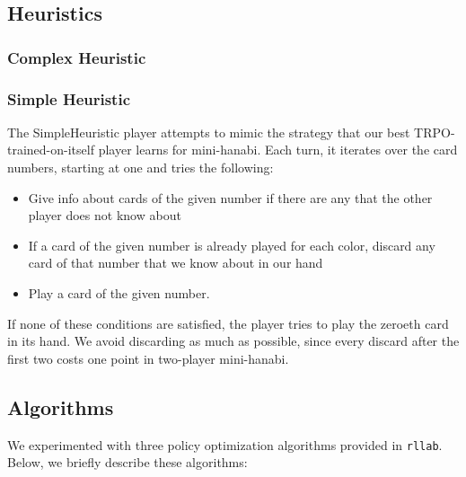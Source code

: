 \subsection{Heuristics}

\subsubsection{Complex Heuristic}

\subsubsection{Simple Heuristic}


The SimpleHeuristic player attempts to mimic the strategy that our best
TRPO-trained-on-itself player learns for mini-hanabi.
Each turn, it iterates over the card numbers, starting at one and tries the following:

\begin{itemize}[leftmargin=*]
\item Give info about cards of the given number if there are any that the other player does not know about
\item If a card of the given number is already played for each color, discard any card of that number that we know about in our hand
\item Play a card of the given number.
\end{itemize}

If none of these conditions are satisfied, the player tries to play the zeroeth card in
its hand. We avoid discarding as much as possible, since every discard after
the first two costs one point in two-player mini-hanabi.

\subsection{Algorithms}
We experimented with three policy optimization algorithms provided in
\texttt{rllab}. Below, we briefly describe these algorithms:

